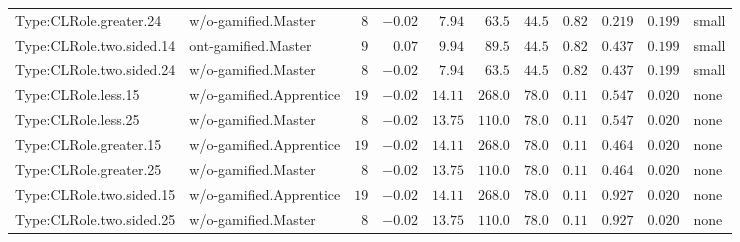\documentclass[6pt,a4paper]{article}
\begin{document}
{\begin{longtable}{llrrrrrrrrl}
Type:CLRole.greater.24&w/o-gamified.Master&$ 8$&$-0.02$&$ 7.94$&$ 63.5$&$ 44.5$&$ 0.82$&$0.219$&$0.199$&small\tabularnewline
Type:CLRole.two.sided.14&ont-gamified.Master&$ 9$&$ 0.07$&$ 9.94$&$ 89.5$&$ 44.5$&$ 0.82$&$0.437$&$0.199$&small\tabularnewline
Type:CLRole.two.sided.24&w/o-gamified.Master&$ 8$&$-0.02$&$ 7.94$&$ 63.5$&$ 44.5$&$ 0.82$&$0.437$&$0.199$&small\tabularnewline
Type:CLRole.less.15&w/o-gamified.Apprentice&$19$&$-0.02$&$14.11$&$268.0$&$ 78.0$&$ 0.11$&$0.547$&$0.020$&none\tabularnewline
Type:CLRole.less.25&w/o-gamified.Master&$ 8$&$-0.02$&$13.75$&$110.0$&$ 78.0$&$ 0.11$&$0.547$&$0.020$&none\tabularnewline
Type:CLRole.greater.15&w/o-gamified.Apprentice&$19$&$-0.02$&$14.11$&$268.0$&$ 78.0$&$ 0.11$&$0.464$&$0.020$&none\tabularnewline
Type:CLRole.greater.25&w/o-gamified.Master&$ 8$&$-0.02$&$13.75$&$110.0$&$ 78.0$&$ 0.11$&$0.464$&$0.020$&none\tabularnewline
\newpage
Type:CLRole.two.sided.15&w/o-gamified.Apprentice&$19$&$-0.02$&$14.11$&$268.0$&$ 78.0$&$ 0.11$&$0.927$&$0.020$&none\tabularnewline
Type:CLRole.two.sided.25&w/o-gamified.Master&$ 8$&$-0.02$&$13.75$&$110.0$&$ 78.0$&$ 0.11$&$0.927$&$0.020$&none\tabularnewline
\hline
\end{longtable}}
\end{document}
